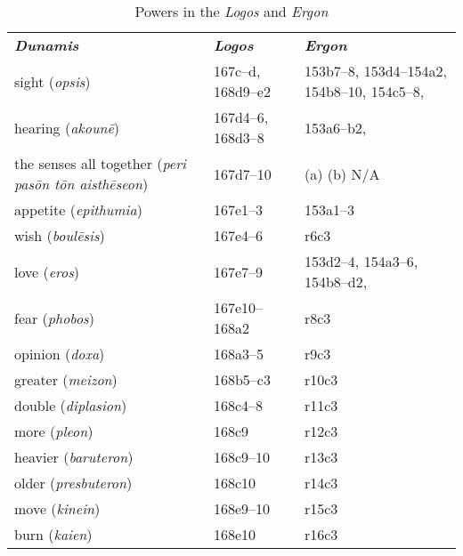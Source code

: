 \begin{table}[htb!]
	\caption{Powers in the \emph{Logos} and \emph{Ergon}}
	\label{table:powers}
	\centering
	\begin{tabular}{lll}
		\textbf{\emph{Dunamis}} & \textbf{\emph{Logos}} & \textbf{\emph{Ergon}}\\
		             sight (\emph{opsis}) &              167c–d, 168d9–e2 &              153b7–8, 153d4–154a2, 154b8–10, 154c5–8, \\
		             hearing (\emph{akounē}) &              167d4–6, 168d3–8 &              153a6–b2,\\
		             the senses all together (\emph{peri pasōn tōn aisthēseon}) &              167d7–10 &              (a) (b) \textsc{N/A}\\
		             appetite (\emph{epithumia}) &              167e1–3 &              153a1–3\\
		             wish (\emph{boulēsis}) &              167e4–6 &              r6c3\\
		             love (\emph{eros}) &              167e7–9 &              153d2–4, 154a3–6, 154b8–d2, \\
		             fear (\emph{phobos}) &              167e10–168a2 &              r8c3\\
		             opinion (\emph{doxa}) &              168a3–5 &              r9c3\\
		            greater (\emph{meizon}) &             168b5–c3 &             r10c3\\
		            double (\emph{diplasion}) &             168c4–8 &             r11c3\\
		            more (\emph{pleon}) &             168c9 &             r12c3\\
		            heavier (\emph{baruteron}) &             168c9–10 &             r13c3\\
		            older (\emph{presbuteron}) &             168c10 &             r14c3\\
		            move (\emph{kinein}) &             168e9–10 &             r15c3\\
					burn (\emph{kaien}) &                168e10 &             r16c3\\
	\end{tabular}
\end{table}